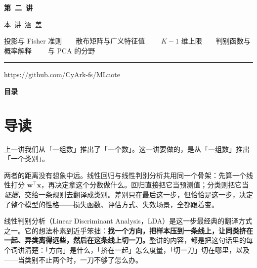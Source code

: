 \documentclass[11pt,a4paper,fontset=windows,zihao=-4]{ctexart}
\makeatletter
\newcommand{\bw}{\mathbf{w}}
\newcommand{\bx}{\mathbf{x}}
\newcommand{\tp}{^{\top}}
\renewcommand{\tableofcontents}{%
  \par\begingroup
    \sffamily\Large\bfseries\color{navy}目\quad 录\par
  \endgroup
  \vspace{0.85em}
  \setlength{\parskip}{0pt}%
  \@starttoc{toc}%
}
\makeatother
\begin{document}
\begin{titlepage}
\vspace*{3.10cm}
{\color{goldlight}\sffamily\bfseries\Large 第\ 二\ 讲\par}
\vspace{1.05cm}
{\color{steel}\sffamily\footnotesize 本\ 讲\ 涵\ 盖\par}
\vspace{0.26cm}
{\color{grey}\footnotesize 投影与 Fisher 准则\ \ \textperiodcentered\ \ 散布矩阵与广义特征值
 \ \ \textperiodcentered\ \ $K-1$ 维上限\ \ \textperiodcentered\ \ 判别函数与概率解释
 \ \ \textperiodcentered\ \ 与 PCA 的分野\par}

\vspace{3.55cm}
{\color{navy!30}\rule{3.0cm}{0.4pt}\par}
\vspace{0.32cm}
{\color{grey}\footnotesize https://github.com/CyArk-fs/MLnote\par}
\end{titlepage}

\setcounter{page}{1}

\tableofcontents
\thispagestyle{plain}
\clearpage

\setcounter{page}{1}

\section*{导\quad 读}

上一讲我们从「一组数」推出了「一个数」。这一讲要做的，是从「一组数」推出「一个类别」。

两者的距离没有想象中远。线性回归与线性判别分析共用同一个骨架：先算一个线性打分 $\bw\tp\bx$，再决定拿这个分数做什么。回归直接把它当预测值；分类则把它当\emph{证据}，交给一条规则去翻译成类别。差别只在最后这一步，但恰恰是这一步，决定了整个模型的性格——损失函数、评估方式、失效场景，全都跟着变。

线性判别分析（Linear Discriminant Analysis，LDA）是这一步最经典的翻译方式之一。它的想法朴素到近乎笨拙：\textbf{找一个方向，把样本压到一条线上，让同类挤在一起、异类离得远些，然后在这条线上切一刀。}整讲的内容，都是把这句话里的每个词讲清楚：「方向」是什么，「挤在一起」怎么度量，「切一刀」切在哪里，以及——当类别不止两个时，一刀不够了怎么办。
\end{document}
